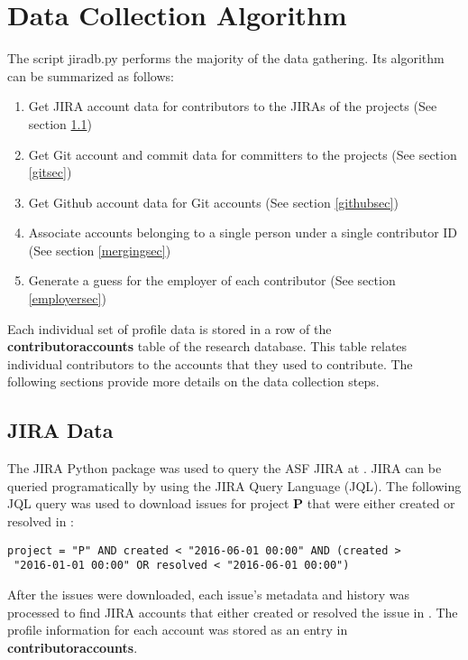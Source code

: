 \section{Data Collection Algorithm}
The script jiradb.py performs the majority of the data gathering. Its algorithm can be summarized as follows:
\begin{enumerate}
	\item Get JIRA account data for contributors to the JIRAs of the projects (See section \ref{jirasec})
	\item Get Git account and commit data for committers to the projects (See section \ref{gitsec})
	\item Get Github account data for Git accounts (See section \ref{githubsec})
	\item Associate accounts belonging to a single person under a single contributor ID (See section \ref{mergingsec})   
	\item Generate a guess for the employer of each contributor (See section \ref{employersec})   
\end{enumerate}

Each individual set of profile data is stored in a row of the \textbf{contributoraccounts} table of the research database. This table relates individual contributors to the accounts that they used to contribute. The following sections provide more details on the data collection steps.

\subsection{JIRA Data}\label{jirasec}
 
 
The JIRA Python package was used to query the ASF JIRA at \ASFJIRAURL. JIRA can be queried programatically by using the JIRA Query Language (JQL). The following JQL query was used to download issues for project \textbf{P} that were either created or resolved in \timeperiod{}:
\begin{lstlisting}
project = "P" AND created < "2016-06-01 00:00" AND (created >
 "2016-01-01 00:00" OR resolved < "2016-06-01 00:00")
\end{lstlisting}
After the issues were downloaded, each issue's metadata and history was processed to find JIRA accounts that either created or resolved the issue in \timeperiod{}. The profile information for each account was stored as an entry in \textbf{contributoraccounts}.
